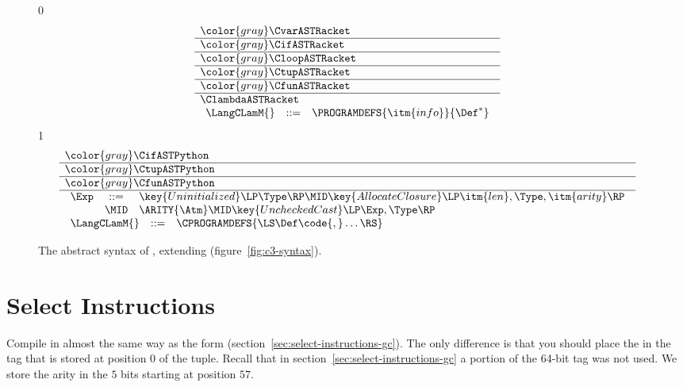 \documentclass[7x10]{TimesAPriori_MIT}%
\newcommand{\gray}[1]{{\color{gray} #1}}
\def\racketEd{0}
\def\pythonEd{1}
\providecommand{\BookEdition}{1}
\let\edition\BookEdition
\newcommand{\pythonColor}[0]{}
\numberwithin{theorem}{chapter}
\numberwithin{definition}{chapter}
\numberwithin{equation}{chapter}
\begin{document}
\newcommand{\ClambdaASTPython}{
\begin{array}{lcl}
\Exp &::=& \key{Uninitialized}\LP \Type \RP
      \MID \key{AllocateClosure}\LP\itm{len},\Type, \itm{arity}\RP \\
      &\MID& \ARITY{\Atm}
      \MID \key{UncheckedCast}\LP\Exp,\Type\RP
\end{array}
}

\begin{figure}[tp]
  \begin{tcolorbox}[colback=white]
\small
{\if\edition\racketEd
\[
\begin{array}{l}
  \gray{\CvarASTRacket} \\ \hline
  \gray{\CifASTRacket} \\ \hline
  \gray{\CloopASTRacket} \\ \hline
  \gray{\CtupASTRacket} \\ \hline
  \gray{\CfunASTRacket} \\ \hline
  \ClambdaASTRacket \\
\begin{array}{lcl}
\LangCLamM{} & ::= & \PROGRAMDEFS{\itm{info}}{\Def^{*}}
\end{array}
\end{array}
\]
\fi}
{\if\edition\pythonEd\pythonColor
\[
  \begin{array}{l}
  \gray{\CifASTPython} \\ \hline
  \gray{\CtupASTPython} \\ \hline
  \gray{\CfunASTPython} \\ \hline
  \ClambdaASTPython \\
  \begin{array}{lcl}
    \LangCLamM{} & ::= & \CPROGRAMDEFS{\LS\Def\code{,}\ldots\RS} 
  \end{array}
  \end{array}
\]
\fi}
  \end{tcolorbox}

\caption{The abstract syntax of \LangCLam{}, extending \LangCFun{} (figure~\ref{fig:c3-syntax}).}
\label{fig:Clam-syntax}
\end{figure}


\section{Select Instructions}
\label{sec:select-instructions-Llambda}

Compile  in almost the
same way as the  form
(section~\ref{sec:select-instructions-gc}). The only difference is
that you should place the  in the tag that is stored at
position $0$ of the tuple. Recall that in
section~\ref{sec:select-instructions-gc} a portion of the 64-bit tag
was not used. We store the arity in the $5$ bits starting at position
$57$.
\end{document}
